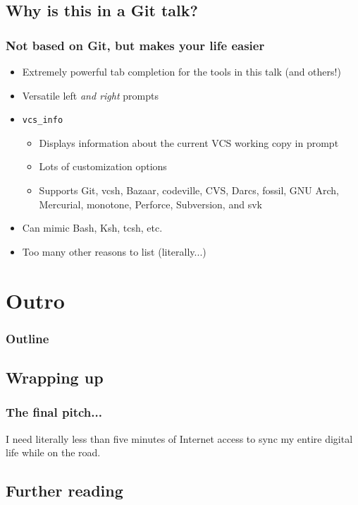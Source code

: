 \documentclass[t]{beamer}
\begin{document}
\subsection{Why is this in a Git talk?}

\begin{frame}
	\frametitle{Not based on Git, but makes your life easier}
	\begin{itemize}
		\item Extremely powerful tab completion for the tools in this talk (and others!)
		\item Versatile left \emph{and right} prompts
		\item \texttt{vcs\_info}
		\begin{itemize}
			\item Displays information about the current VCS working copy in prompt
			\item Lots of customization options
			\item Supports Git, vcsh, Bazaar, codeville, CVS, Darcs, fossil, GNU Arch, Mercurial, monotone, Perforce, Subversion, and svk
		\end{itemize}
		\item Can mimic Bash, Ksh, tcsh, etc.
		\item Too many other reasons to list (literally...)
	\end{itemize}
\end{frame}


\section{Outro}

\begin{frame}
	\frametitle{Outline}
	\tableofcontents[currentsection]
\end{frame}

\subsection{Wrapping up}

\begin{frame}
	\frametitle{The final pitch...}
	\vfill
	I need literally less than five minutes of Internet access to sync my entire digital life while on the road.
	\vfill
\end{frame}

\subsection{Further reading}
\end{document}
